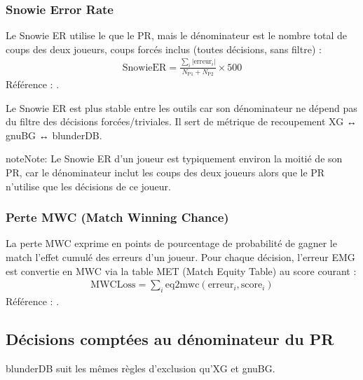 \documentclass[letterpaper,10pt,french]{sphinxmanual}
\begin{document}
\subsubsection{Snowie Error Rate}
\label{\detokenize{stats_parity:snowie-error-rate}}
\sphinxAtStartPar
Le Snowie ER utilise le  que le PR, mais le dénominateur est
le nombre total de coups des deux joueurs, coups forcés inclus (toutes décisions,
sans filtre) :
\begin{equation*}
\begin{split}\mathrm{SnowieER} = \frac{\sum_i |\mathrm{erreur}_i|}{N_\text{P1} + N_\text{P2}} \times 500\end{split}
\end{equation*}
\sphinxAtStartPar
Référence : .

\sphinxAtStartPar
Le Snowie ER est plus stable entre les outils car son dénominateur ne dépend pas
du filtre des décisions forcées/triviales. Il sert de métrique de recoupement
XG ↔ gnuBG ↔ blunderDB.

\begin{sphinxadmonition}{note}{Note:}
\sphinxAtStartPar
Le Snowie ER d’un joueur est typiquement environ la moitié de son PR, car le
dénominateur inclut les coups des deux joueurs alors que le PR n’utilise que
les décisions de ce joueur.
\end{sphinxadmonition}


\subsubsection{Perte MWC (Match Winning Chance)}
\label{\detokenize{stats_parity:perte-mwc-match-winning-chance}}
\sphinxAtStartPar
La perte MWC exprime en points de pourcentage de probabilité de gagner le match
l’effet cumulé des erreurs d’un joueur. Pour chaque décision, l’erreur EMG est
convertie en MWC via la table MET (Match Equity Table) au score courant :
\begin{equation*}
\begin{split}\mathrm{MWCLoss} = \sum_i \mathrm{eq2mwc}(\mathrm{erreur}_i, \mathrm{score}_i)\end{split}
\end{equation*}
\sphinxAtStartPar
Référence : .


\subsection{Décisions comptées au dénominateur du PR}
\label{\detokenize{stats_parity:decisions-comptees-au-denominateur-du-pr}}
\sphinxAtStartPar
blunderDB suit les mêmes règles d’exclusion qu’XG et gnuBG.
\end{document}
